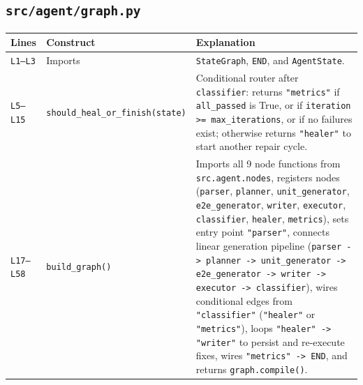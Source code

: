 \documentclass[11pt,a4paper]{article}
\begin{document}
\subsection{\texttt{src/agent/graph.py}}
\begin{longtable}{L{1.4cm} L{5.2cm} L{9.0cm}}
\toprule
\textbf{Lines} & \textbf{Construct} & \textbf{Explanation} \\
\midrule
\endhead
\texttt{L1--L3} & Imports & \texttt{StateGraph}, \texttt{END}, and \texttt{AgentState}. \\
\texttt{L5--L15} & \texttt{should\_heal\_or\_finish(state)} & Conditional router after \texttt{classifier}: returns \texttt{"metrics"} if \texttt{all\_passed} is True, or if \texttt{iteration >= max\_iterations}, or if no failures exist; otherwise returns \texttt{"healer"} to start another repair cycle. \\
\texttt{L17--L58} & \texttt{build\_graph()} & Imports all 9 node functions from \texttt{src.agent.nodes}, registers nodes (\texttt{parser}, \texttt{planner}, \texttt{unit\_generator}, \texttt{e2e\_generator}, \texttt{writer}, \texttt{executor}, \texttt{classifier}, \texttt{healer}, \texttt{metrics}), sets entry point \texttt{"parser"}, connects linear generation pipeline (\texttt{parser -> planner -> unit\_generator -> e2e\_generator -> writer -> executor -> classifier}), wires conditional edges from \texttt{"classifier"} (\texttt{"healer"} or \texttt{"metrics"}), loops \texttt{"healer" -> "writer"} to persist and re-execute fixes, wires \texttt{"metrics" -> END}, and returns \texttt{graph.compile()}. \\
\bottomrule
\end{longtable}

\end{document}
